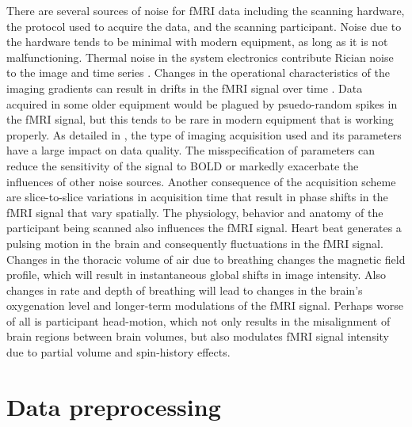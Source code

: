 There are several sources of noise for fMRI data including the scanning hardware, the protocol used to acquire the data, and the scanning participant. Noise due to the hardware tends to be minimal with modern equipment, as long as it is not malfunctioning. Thermal noise in the system electronics contribute Rician noise to the image and time series \cite{Gudbjartsson1995}. Changes in the operational characteristics of the imaging gradients can result in drifts in the fMRI signal over time \cite{Smith1999}. Data acquired in some older equipment would be plagued by psuedo-random spikes in the fMRI signal, but this tends to be rare in modern equipment that is working properly. As detailed in \cite{Craddock2013}, the type of imaging acquisition used and its parameters have a large impact on data quality. The misspecification of parameters can reduce the sensitivity of the signal to BOLD or markedly exacerbate the influences of other noise sources. Another consequence of the acquisition scheme are slice-to-slice variations in acquisition time that result in phase shifts in the fMRI signal that vary spatially. The physiology, behavior and anatomy of the participant being scanned also influences the fMRI signal. Heart beat generates a pulsing motion in the brain and consequently fluctuations in the fMRI signal. Changes in the thoracic volume of air due to breathing changes the magnetic field profile, which will result in instantaneous global shifts in image intensity. Also changes in rate and depth of breathing will lead to changes in the brain's oxygenation level and longer-term modulations of the fMRI signal. Perhaps worse of all is participant head-motion, which not only results in the misalignment of brain regions between brain volumes, but also modulates fMRI signal intensity due to partial volume and spin-history effects. 

\section*{Data preprocessing}


